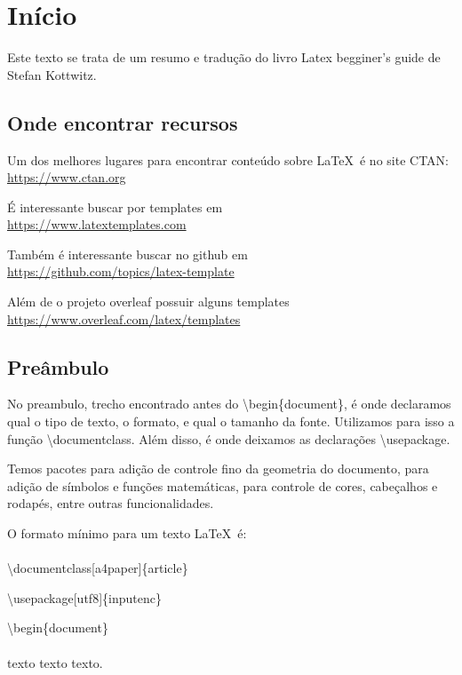 \documentclass[a4paper, 12pt, oneside]{book}
\begin{document}


\chapter{Início}
Este texto se trata de um resumo e tradução do livro Latex begginer's guide de Stefan Kottwitz.

\section{Onde encontrar recursos}
Um dos melhores lugares para encontrar conteúdo sobre \LaTeX\ é no site CTAN:\\
\indent \url{https://www.ctan.org}

É interessante buscar por templates em\\
\indent \url{https://www.latextemplates.com}

Também é interessante buscar no github em\\
\indent \url{https://github.com/topics/latex-template}

Além de o projeto overleaf possuir alguns templates\\
\indent \url{https://www.overleaf.com/latex/templates}

\section{Preâmbulo}
No preambulo, trecho encontrado antes do \textbackslash begin\{document\},
é onde declaramos qual o tipo de texto, o formato, e qual o tamanho da fonte.
Utilizamos para isso a função \textbackslash documentclass.
Além disso, é onde deixamos as declarações \textbackslash usepackage.

Temos pacotes para adição de controle fino da geometria do documento,
para adição de símbolos e funções matemáticas,
para controle de cores, cabeçalhos e rodapés, entre outras funcionalidades.

O formato mínimo para um texto \LaTeX\ é:
\\
\\
\noindent \textbackslash documentclass[a4paper]\{article\}

\noindent \textbackslash usepackage[utf8]\{inputenc\}

\noindent \textbackslash begin\{document\}
\\
\\
\noindent texto texto texto.
\\
\end{document}
